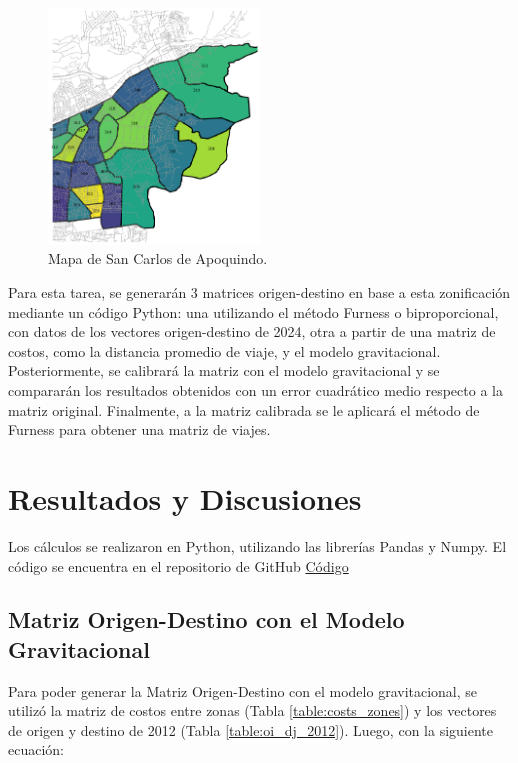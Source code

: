 \documentclass[letterpaper,12pt]{article}
\begin{document}
\begin{figure}[h!]
    \centering
    \includegraphics[width=0.5\textwidth]{fotos/mapa.png}
    \caption{Mapa de San Carlos de Apoquindo.}
    \label{fig:mapa}
\end{figure}

Para esta tarea, se generarán 3 matrices origen-destino en base a esta zonificación mediante un código Python: una utilizando el método Furness o biproporcional, con datos de los vectores origen-destino de 2024, otra a partir de una matriz de costos, como la distancia promedio de viaje, y el modelo gravitacional. Posteriormente, se calibrará la matriz con el modelo gravitacional y se compararán los resultados obtenidos con un error cuadrático medio respecto a la matriz original. Finalmente, a la matriz calibrada se le aplicará el método de Furness para obtener una matriz de viajes.

\newpage

\section{Resultados y Discusiones}
Los cálculos se realizaron en Python, utilizando las librerías Pandas y Numpy. El código se encuentra en el repositorio de GitHub \href{https://github.com/berckanala/T3_autitos/blob/main/t3.py}{Código}
\subsection{Matriz Origen-Destino con el Modelo Gravitacional}
Para poder generar la Matriz Origen-Destino con el modelo gravitacional, se utilizó la matriz de costos entre zonas (Tabla \ref{table:costs_zones}) y los vectores de origen y destino de 2012 (Tabla \ref{table:oi_dj_2012}). Luego, con la siguiente ecuación: 
\end{document}
